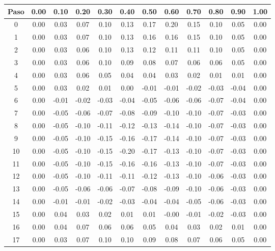 \documentclass[11pt]{article}
\begin{document}
\begin{table}
\center
\begin{small}
\begin{tabular}{ c c c c c c c c c c c c }
\hline
Paso & 0.00 & 0.10 & 0.20 & 0.30 & 0.40 & 0.50 & 0.60 & 0.70 & 0.80 & 0.90 & 1.00 \\
\hline
\hline
0 & 0.00 & 0.03 & 0.07 & 0.10 & 0.13 & 0.17 & 0.20 & 0.15 & 0.10 & 0.05 & 0.00 \\
1 & 0.00 & 0.03 & 0.07 & 0.10 & 0.13 & 0.16 & 0.16 & 0.15 & 0.10 & 0.05 & 0.00 \\
2 & 0.00 & 0.03 & 0.06 & 0.10 & 0.13 & 0.12 & 0.11 & 0.11 & 0.10 & 0.05 & 0.00 \\
3 & 0.00 & 0.03 & 0.06 & 0.10 & 0.09 & 0.08 & 0.07 & 0.06 & 0.06 & 0.05 & 0.00 \\
4 & 0.00 & 0.03 & 0.06 & 0.05 & 0.04 & 0.04 & 0.03 & 0.02 & 0.01 & 0.01 & 0.00 \\
5 & 0.00 & 0.03 & 0.02 & 0.01 & 0.00 & -0.01 & -0.01 & -0.02 & -0.03 & -0.04 & 0.00 \\
6 & 0.00 & -0.01 & -0.02 & -0.03 & -0.04 & -0.05 & -0.06 & -0.06 & -0.07 & -0.04 & 0.00 \\
7 & 0.00 & -0.05 & -0.06 & -0.07 & -0.08 & -0.09 & -0.10 & -0.10 & -0.07 & -0.03 & 0.00 \\
8 & 0.00 & -0.05 & -0.10 & -0.11 & -0.12 & -0.13 & -0.14 & -0.10 & -0.07 & -0.03 & 0.00 \\
9 & 0.00 & -0.05 & -0.10 & -0.15 & -0.16 & -0.17 & -0.14 & -0.10 & -0.07 & -0.03 & 0.00 \\
10 & 0.00 & -0.05 & -0.10 & -0.15 & -0.20 & -0.17 & -0.13 & -0.10 & -0.07 & -0.03 & 0.00 \\
11 & 0.00 & -0.05 & -0.10 & -0.15 & -0.16 & -0.16 & -0.13 & -0.10 & -0.07 & -0.03 & 0.00 \\
12 & 0.00 & -0.05 & -0.10 & -0.11 & -0.11 & -0.12 & -0.13 & -0.10 & -0.06 & -0.03 & 0.00 \\
13 & 0.00 & -0.05 & -0.06 & -0.06 & -0.07 & -0.08 & -0.09 & -0.10 & -0.06 & -0.03 & 0.00 \\
14 & 0.00 & -0.01 & -0.01 & -0.02 & -0.03 & -0.04 & -0.04 & -0.05 & -0.06 & -0.03 & 0.00 \\
15 & 0.00 & 0.04 & 0.03 & 0.02 & 0.01 & 0.01 & -0.00 & -0.01 & -0.02 & -0.03 & 0.00 \\
16 & 0.00 & 0.04 & 0.07 & 0.06 & 0.06 & 0.05 & 0.04 & 0.03 & 0.02 & 0.01 & 0.00 \\
17 & 0.00 & 0.03 & 0.07 & 0.10 & 0.10 & 0.09 & 0.08 & 0.07 & 0.06 & 0.05 & 0.00 \\

\end{tabular}
\end{small}
\end{table}
\end{document}
